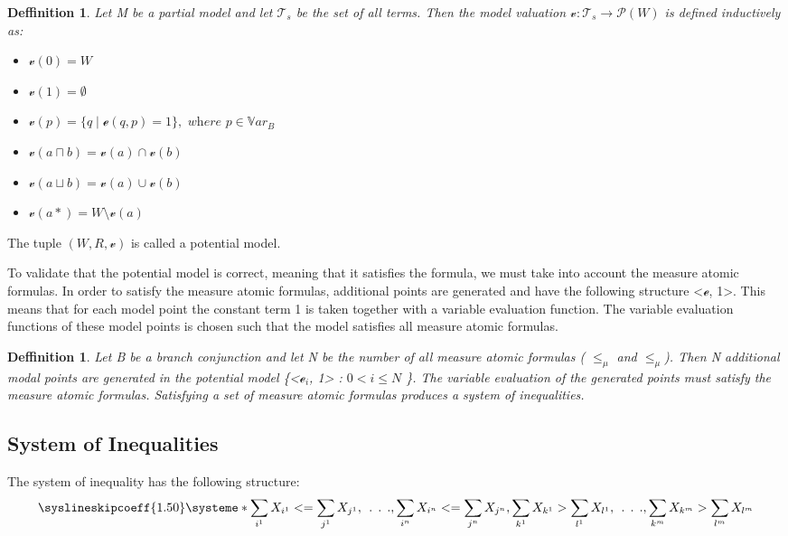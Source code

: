 \documentclass{article}
\newtheorem{defn}[theorem]{Deffinition}
\newcommand{\curvedE}{\mathscr{e}}
\newcommand{\Var}{\mathbb{V}ar}
\newcommand{\vE}{\mathscr{v}}
\newcommand{\Ts}{\mathcal{T}_s}
\begin{document}
	\begin{defn}
		Let M be a partial model and let $\Ts$ be the set of all terms. Then the model valuation $\vE : \Ts \rightarrow \mathscr{P}(W)$ is defined inductively as:
		\begin{itemize}
			\item $\vE(0) = W$
			\item $\vE(1) = \emptyset$
			\item $\vE(p) = \{ q \; | \; \curvedE(q, p) = 1\}, \textit{ where } p \in \Var_B$
			\item $\vE(a \sqcap b) = \vE(a) \cap \vE(b)$
			\item $\vE(a \sqcup b) = \vE(a) \cup \vE(b)$
			\item $\vE(a*) = W \setminus \vE(a)$
		\end{itemize}
	\end{defn}
		The tuple $(W, R, \vE)$ is called a potential model.

	\leavevmode\newline
	To validate that the potential model is correct, meaning that it satisfies the formula, we must take into account the measure atomic formulas. 
	In order to satisfy the measure atomic formulas, additional points are generated and have the following structure <$\curvedE$, 1>. This means that 
	for each model point the constant term 1 is taken together with a variable evaluation function. The variable evaluation functions of these model points 
	is chosen such that the model satisfies all measure atomic formulas.

	\begin{defn}
		Let B be a branch conjunction and let N be the number of all measure atomic formulas ( $\le_\mu$ and $\leq_\mu$).
		Then N additional modal points are generated in the potential model \{<$\curvedE_i$, 1> : $0 < i \leq N$ \}. The variable evaluation of the generated points must satisfy the measure atomic formulas.
		Satisfying a set of measure atomic formulas produces a system of inequalities.
	\end{defn}

	\subsection{System of Inequalities} 
		The system of inequality has the following structure:
		\[
			\syslineskipcoeff{1.50}
			\systeme*{\sum_{i^1} X_{i^1} <= \sum_{j^1} X_{j^1},
				\:\:.\:\:.\:\:.,
				\sum_{i^n} X_{i^n} <= \sum_{j^n} X_{j^n}, 
				\sum_{k^1} X_{k^1} > \sum_{l^1} X_{l^1},
				\:\:.\:\:.\:\:.,
				\sum_{k^m} X_{k^m} > \sum_{l^m} X_{l^m}
				}
		\]
\end{document}
